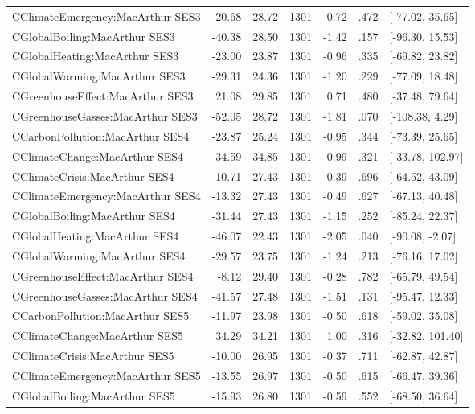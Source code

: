 \begin{table}[ht]
\begin{tabular}{lrrrrrl}
  CClimateEmergency:MacArthur SES3 & -20.68 & 28.72 & 1301 & -0.72 & .472 & [-77.02, 35.65] \\ 
  CGlobalBoiling:MacArthur SES3 & -40.38 & 28.50 & 1301 & -1.42 & .157 & [-96.30, 15.53] \\ 
  CGlobalHeating:MacArthur SES3 & -23.00 & 23.87 & 1301 & -0.96 & .335 & [-69.82, 23.82] \\ 
  CGlobalWarming:MacArthur SES3 & -29.31 & 24.36 & 1301 & -1.20 & .229 & [-77.09, 18.48] \\ 
  CGreenhouseEffect:MacArthur SES3 & 21.08 & 29.85 & 1301 & 0.71 & .480 & [-37.48, 79.64] \\ 
  CGreenhouseGasses:MacArthur SES3 & -52.05 & 28.72 & 1301 & -1.81 & .070 & [-108.38, 4.29] \\ 
  CCarbonPollution:MacArthur SES4 & -23.87 & 25.24 & 1301 & -0.95 & .344 & [-73.39, 25.65] \\ 
  CClimateChange:MacArthur SES4 & 34.59 & 34.85 & 1301 & 0.99 & .321 & [-33.78, 102.97] \\ 
  CClimateCrisis:MacArthur SES4 & -10.71 & 27.43 & 1301 & -0.39 & .696 & [-64.52, 43.09] \\ 
  CClimateEmergency:MacArthur SES4 & -13.32 & 27.43 & 1301 & -0.49 & .627 & [-67.13, 40.48] \\ 
  CGlobalBoiling:MacArthur SES4 & -31.44 & 27.43 & 1301 & -1.15 & .252 & [-85.24, 22.37] \\ 
  CGlobalHeating:MacArthur SES4 & -46.07 & 22.43 & 1301 & -2.05 & .040 & [-90.08, -2.07] \\ 
  CGlobalWarming:MacArthur SES4 & -29.57 & 23.75 & 1301 & -1.24 & .213 & [-76.16, 17.02] \\ 
  CGreenhouseEffect:MacArthur SES4 & -8.12 & 29.40 & 1301 & -0.28 & .782 & [-65.79, 49.54] \\ 
  CGreenhouseGasses:MacArthur SES4 & -41.57 & 27.48 & 1301 & -1.51 & .131 & [-95.47, 12.33] \\ 
  CCarbonPollution:MacArthur SES5 & -11.97 & 23.98 & 1301 & -0.50 & .618 & [-59.02, 35.08] \\ 
  CClimateChange:MacArthur SES5 & 34.29 & 34.21 & 1301 & 1.00 & .316 & [-32.82, 101.40] \\ 
  CClimateCrisis:MacArthur SES5 & -10.00 & 26.95 & 1301 & -0.37 & .711 & [-62.87, 42.87] \\ 
  CClimateEmergency:MacArthur SES5 & -13.55 & 26.97 & 1301 & -0.50 & .615 & [-66.47, 39.36] \\ 
  CGlobalBoiling:MacArthur SES5 & -15.93 & 26.80 & 1301 & -0.59 & .552 & [-68.50, 36.64] \\ 

\end{tabular}
\end{table}
